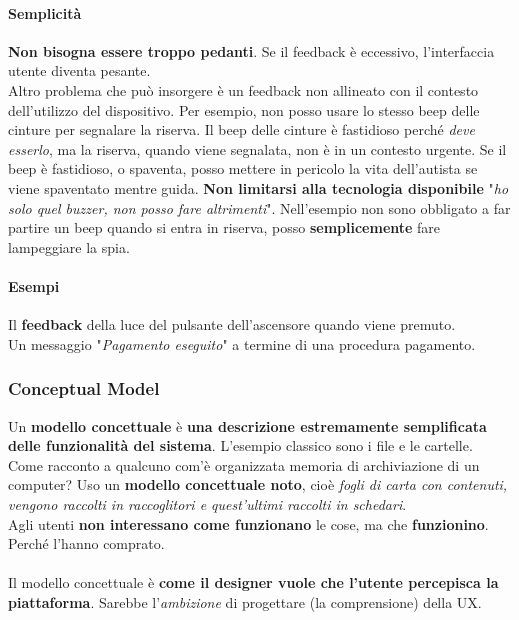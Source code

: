 \documentclass[10pt]{article}
\begin{document}
\paragraph{Semplicità} \textbf{Non bisogna essere troppo pedanti}. Se il feedback è eccessivo, l'interfaccia utente diventa pesante.\\
Altro problema che può insorgere è un feedback non allineato con il contesto dell'utilizzo del dispositivo. Per esempio, non posso usare lo stesso beep delle cinture per segnalare la riserva. Il beep delle cinture è fastidioso perché \textit{deve esserlo}, ma la riserva, quando viene segnalata, non è in un contesto urgente. Se il beep è fastidioso, o spaventa, posso mettere in pericolo la vita dell'autista se viene spaventato mentre guida. \textbf{Non limitarsi alla tecnologia disponibile} "\textit{ho solo quel buzzer, non posso fare altrimenti}". Nell'esempio non sono obbligato a far partire un beep quando si entra in riserva, posso \textbf{semplicemente} fare lampeggiare la spia.
\paragraph{Esempi} Il \textbf{feedback} della luce del pulsante dell'ascensore quando viene premuto.\\Un messaggio "\textit{Pagamento eseguito}" a termine di una procedura pagamento.
\subsubsection{Conceptual Model}
Un \textbf{modello concettuale} è \textbf{una descrizione estremamente semplificata delle funzionalità del sistema}. L'esempio classico sono i file e le cartelle. Come racconto a qualcuno com'è organizzata memoria di archiviazione di un computer? Uso un \textbf{modello concettuale noto}, cioè \textit{fogli di carta con contenuti, vengono raccolti in raccoglitori e quest'ultimi raccolti in schedari}.\\
Agli utenti \textbf{non interessano come funzionano} le cose, ma che \textbf{funzionino}. Perché l'hanno comprato.\\\\
Il modello concettuale è \textbf{come il designer vuole che l'utente percepisca la piattaforma}. Sarebbe l'\textit{ambizione} di progettare (la comprensione) della UX.
\end{document}
